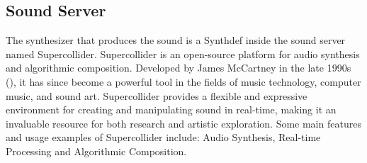 \documentclass[a4paper]{book}
\begin{document}
\subsection{Sound Server}
The synthesizer that produces the sound is a Synthdef inside the sound server named Supercollider. Supercollider is an open-source platform for audio synthesis and algorithmic composition. Developed by James McCartney in the late 1990s (\cite{scBook}), it has since become a powerful tool in the fields of music technology, computer music, and sound art. Supercollider provides a flexible and expressive environment for creating and manipulating sound in real-time, making it an invaluable resource for both research and artistic exploration. Some main features and usage examples of Supercollider include: Audio Synthesis, Real-time Processing and Algorithmic Composition.
\end{document}
